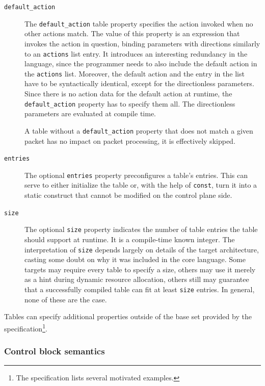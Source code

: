 \begin{description}
\item[\texttt{default\_action}] The \texttt{default\_action} table property
specifies the action invoked when no other actions match. The value of this
property is an expression that invokes the action in question, binding
parameters with directions similarly to an \texttt{actions} list entry. It
introduces an interesting redundancy in the \pfs language, since the programmer
needs to also include the default action in the \texttt{actions} list. Moreover,
the default action and the entry in the list have to be syntactically identical,
except for the directionless parameters. Since there is no action data for the
default action at runtime, the \texttt{default\_action} property has to specify
them all. The directionless parameters are evaluated at compile time.

A table without a \texttt{default\_action} property that does not match a given
packet has no impact on packet processing, it is effectively skipped.

\item[\texttt{entries}] The optional \texttt{entries} property preconfigures a
table's entries. This can serve to either initialize the table or, with the help
of \texttt{const}, turn it into a static construct that cannot be modified on
the control plane side.

\item[\texttt{size}] The optional \texttt{size} property indicates the number of
table entries the table should support at runtime. It is a compile-time known
integer. The interpretation of \texttt{size} depends largely on details of the
target architecture, casting some doubt on why it was included in the core
language. Some targets may require every table to specify a size, others may use
it merely as a hint during dynamic resource allocation, others still may
guarantee that a successfully compiled table can fit at least \texttt{size}
entries. In general, none of these are the case.

\end{description}

Tables can specify additional properties outside of the base set provided by the
\pfs specification\footnote{The specification lists several motivated
examples.}.

\subsubsection*{Control block semantics}

